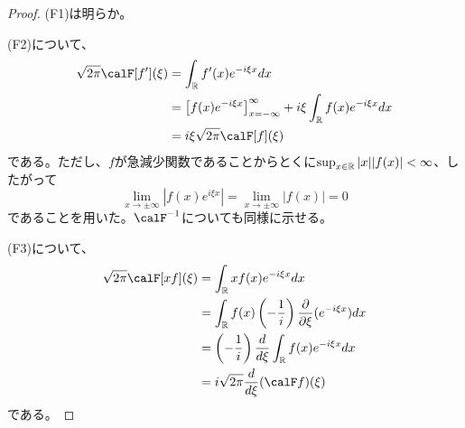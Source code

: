 \documentclass[report]{jlreq}
\begin{document}
\begin{proof}
    (F1)は明らか。

    (F2)について、
    \begin{equation}
        \begin{split}
            \sqrt{2 \pi} \calF [f'](\xi)
                &= \int_\R f'(x) e^{-i\xi x} dx \\
                &= \left[ f(x) e^{-i\xi x} \right]_{x = -\infty}^\infty
                    + i\xi \int_\R f(x) e^{-i\xi x} dx \\
                &= i\xi \sqrt{2 \pi} \calF [f](\xi)
        \end{split}
    \end{equation}
    である。ただし、$f$が急減少関数であることからとくに$\sup_{x \in \mathbb{R}} |x| |f(x)| < \infty$、したがって
    \begin{equation}
        \lim_{x \to \pm\infty} |f(x) e^{i\xi x}| = \lim_{x \to \pm\infty} |f(x)| = 0
    \end{equation}
    であることを用いた。$\calF^{-1}$についても同様に示せる。

    (F3)について、
    \begin{equation}
        \begin{split}
            \sqrt{2\pi} \calF [xf](\xi)
                &= \int_\R xf(x) e^{-i\xi x} dx \\
                &= \int_\R f(x) \left(-\frac{1}{i}\right) \frac{\partial}{\partial \xi} (e^{-i\xi x}) dx \\
                &= \left(-\frac{1}{i}\right) \dd{\xi} \int_\R f(x) e^{-i\xi x} dx \\
                &= i \sqrt{2\pi} \dd{\xi} (\calF f) (\xi)
        \end{split}
    \end{equation}
    である。


\end{proof}
\end{document}
